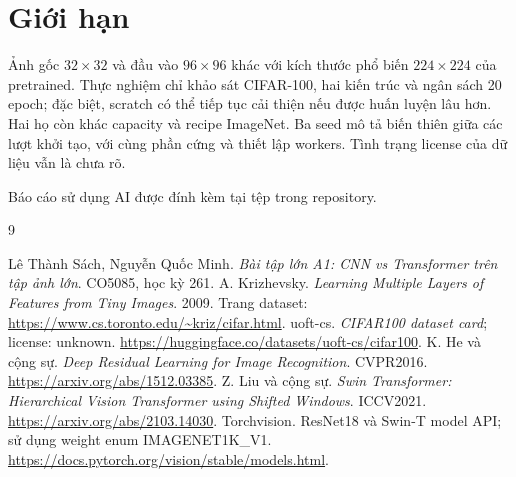\documentclass[12pt,a4paper]{report}
\numberwithin{equation}{chapter}
\newcommand{\code}[1]{\texttt{\detokenize{#1}}}
\begin{document}
\section{Giới hạn}
Ảnh gốc $32\times32$ và đầu vào $96\times96$ khác với kích thước phổ biến
$224\times224$ của pretrained. Thực nghiệm chỉ khảo sát CIFAR-100, hai kiến
trúc và ngân sách 20 epoch; đặc biệt, scratch có thể tiếp tục cải thiện nếu
được huấn luyện lâu hơn. Hai họ còn khác capacity và recipe ImageNet.
Ba seed mô tả biến thiên giữa các lượt khởi tạo, với cùng phần cứng và
thiết lập workers. Tình trạng license của dữ liệu vẫn là chưa rõ.

Báo cáo sử dụng AI được đính kèm tại tệp \code{AI_USE_REPORT.md} trong repository.

\begin{thebibliography}{9}
 Lê Thành Sách, Nguyễn Quốc Minh. \emph{Bài tập lớn A1: CNN vs Transformer trên tập ảnh lớn}. CO5085, học kỳ 261.
 A. Krizhevsky. \emph{Learning Multiple Layers of Features from Tiny Images}. 2009. Trang dataset: \url{https://www.cs.toronto.edu/~kriz/cifar.html}.
 uoft-cs. \emph{CIFAR100 dataset card}; license: unknown. \url{https://huggingface.co/datasets/uoft-cs/cifar100}.
 K. He và cộng sự. \emph{Deep Residual Learning for Image Recognition}. CVPR2016. \url{https://arxiv.org/abs/1512.03385}.
 Z. Liu và cộng sự. \emph{Swin Transformer: Hierarchical Vision Transformer using Shifted Windows}. ICCV2021. \url{https://arxiv.org/abs/2103.14030}.
 Torchvision. ResNet18 và Swin-T model API; sử dụng weight enum IMAGENET1K\_V1. \url{https://docs.pytorch.org/vision/stable/models.html}.
\end{thebibliography}
\end{document}
